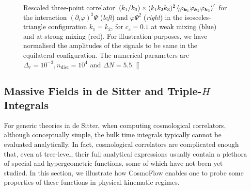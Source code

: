 \documentclass[11pt]{article}
\numberwithin{equation}{section} %
\begin{document}
\begin{figure}[h!]
  \centering
  \hspace*{0.2cm}
  \vspace*{0.2cm}
  \caption{Rescaled three-point correlator $(k_1/k_3)\times(k_1 k_2 k_3)^2\braket{\varphi_{\bm{k}_1} \varphi_{\bm{k}_2} \varphi_{\bm{k}_3}}'$ for the interaction $(\partial_i \varphi)^2\Psi$ (\textit{left}) and $\dot{\varphi}\Psi^2$ (\textit{right}) in the isosceles-triangle configuration $k_1=k_2$, for $c_s=0.1$ at weak mixing (\textcolor{pyblue}{blue}) and at strong mixing (\textcolor{pyred}{red}). For illustration purposes, we have normalised the amplitudes of the signals to be same in the equilateral configuration. The numerical parameters are $\Delta_r = 10^{-3}, n_{\text{disc}} = 10^4$ and $\Delta N = 5.5$. [\href{https://github.com/deniswerth/CosmoFlow/blob/main/CosmoFlow/PhiPsi/KinematicDependence.ipynb}{\faGithub}]}
  \label{fig: soft limits}
\end{figure}


\subsection{Massive Fields in de Sitter and Triple-$H$ Integrals}

For generic theories in de Sitter, when computing cosmological correlators, although conceptually simple, the bulk time integrals typically cannot be evaluated analytically. In fact, cosmological correlators are complicated enough that, even at tree-level, their full analytical expressions usually contain a plethora of special and hypergeometric functions, some of which have not been yet studied. In this section, we illustrate how \textsf{CosmoFlow} enables one to probe some properties of these functions in physical kinematic regimes. 
\end{document}

